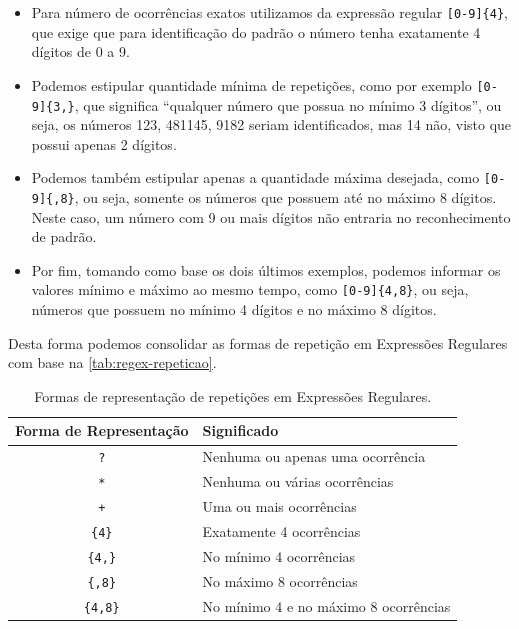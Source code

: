 \begin{itemize}

    \item Para número de ocorrências exatos utilizamos da expressão regular \texttt{[0-9]\{4\}}, que exige que para identificação do padrão o número tenha exatamente 4 dígitos de 0 a 9.

    \item Podemos estipular quantidade mínima de repetições, como por exemplo \texttt{[0-9]\{3,\}}, que significa ``qualquer número que possua no mínimo 3 dígitos'', ou seja, os números 123, 481145, 9182 seriam identificados, mas 14 não, visto que possui apenas 2 dígitos.

    \item Podemos também estipular apenas a quantidade máxima desejada, como \texttt{[0-9]\{,8\}}, ou seja, somente os números que possuem até no máximo 8 dígitos. Neste caso, um número com 9 ou mais dígitos não entraria no reconhecimento de padrão.

    \item Por fim, tomando como base os dois últimos exemplos, podemos informar os valores mínimo e máximo ao mesmo tempo, como \texttt{[0-9]\{4,8\}}, ou seja, números que possuem no mínimo 4 dígitos e no máximo 8 dígitos.

\end{itemize}

Desta forma podemos consolidar as formas de repetição em Expressões Regulares com base na \autoref{tab:regex-repeticao}.

\begin{table}[h!]
    \caption{Formas de representação de repetições em Expressões Regulares.}
    \begin{center}
        \begin{tabular}{|c|l|}
            \hline 
            \textbf{Forma de Representação} & \textbf{Significado} \\ 
            \hline 
            \texttt{?} & Nenhuma ou apenas uma ocorrência \\
            \hline 
            \texttt{*} & Nenhuma ou várias ocorrências \\
            \hline
            \texttt{+} & Uma ou mais ocorrências \\
            \hline
            \texttt{\{4\}} & Exatamente 4 ocorrências \\
            \hline
            \texttt{\{4,\}} & No mínimo 4 ocorrências \\
            \hline
            \texttt{\{,8\}} & No máximo 8 ocorrências \\
            \hline
            \texttt{\{4,8\}} & No mínimo 4 e no máximo 8 ocorrências \\
            \hline
        \end{tabular}
    \end{center}
    \label{tab:regex-repeticao}
\end{table}

